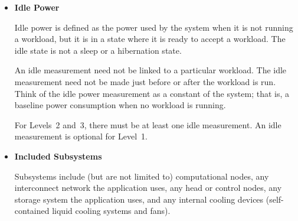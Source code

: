 \begin{itemize}



\item[{[ ]}]
\textbf{Idle Power}

Idle power is defined as the power used by the system when it is not running a workload, but it is in a state where it is ready to accept a workload.
The idle state is not a sleep or a hibernation state.

An idle measurement need not be linked to a particular workload.
The idle measurement need not be made just before or after the workload is run.
Think of the idle power measurement as a constant of the system; that is,
a baseline power consumption when no workload is running.

For Levels~2 and~3, there must be at least one idle measurement.
An idle measurement is optional for Level~1.

\item[{[ ]}]
\textbf{Included Subsystems}

Subsystems include (but are not limited to) computational nodes, any interconnect network the application uses, any head or control nodes, any storage system the application uses, and any internal cooling devices (self-contained liquid cooling systems and fans).




\end{itemize}

